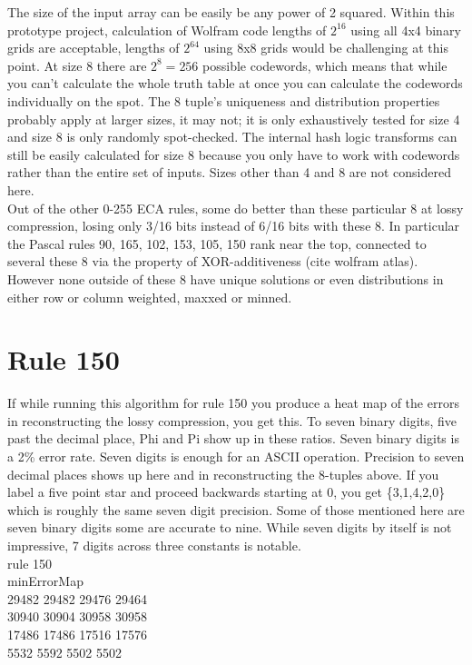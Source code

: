 \documentclass[11pt]{article}
\begin{document}
The size of the input array can be easily be any power of 2 squared. Within this prototype project, calculation of Wolfram code lengths of $2^{16}$ using all 4x4 binary grids are acceptable, lengths of $2^{64}$ using 8x8 grids would be challenging at this point. At size 8 there are $2^8=256$ possible codewords, which means that while you can't calculate the whole truth table at once you can calculate the codewords individually on the spot. The 8 tuple's uniqueness and distribution properties probably apply at larger sizes, it may not; it is only exhaustively tested for size 4 and size 8 is only randomly spot-checked. The internal hash logic transforms can still be easily calculated for size 8 because you only have to work with codewords rather than the entire set of inputs. Sizes other than 4 and 8 are not considered here.\\

Out of the other 0-255 ECA rules, some do better than these particular 8 at lossy compression, losing only 3/16 bits instead of 6/16 bits with these 8. In particular the Pascal rules 90, 165, 102, 153, 105, 150 rank near the top, connected to several these 8 via the property of XOR-additiveness (cite wolfram atlas). However none outside of these 8 have unique solutions or even distributions in either row or column weighted, maxxed or minned.\\

\section{Rule 150}

If while running this algorithm for rule 150 you produce a heat map of the errors in reconstructing the lossy compression, you get this. To seven binary digits, five past the decimal place, Phi and Pi show up in these ratios. Seven binary digits is a 2\% error rate. Seven digits is enough for an ASCII operation. Precision to seven decimal places shows up here and in reconstructing the 8-tuples above. If you label a five point star and proceed backwards starting at 0, you get \{3,1,4,2,0\} which is roughly the same seven digit precision. Some of those mentioned here are seven binary digits some are accurate to nine. While seven digits by itself is not impressive, 7 digits across three constants is notable.\\

\noindent rule 150\\

\noindent minErrorMap\\
29482 29482 29476 29464 \\
30940 30904 30958 30958 \\
17486 17486 17516 17576 \\
5532 5592 5502 5502 \\
\end{document}
